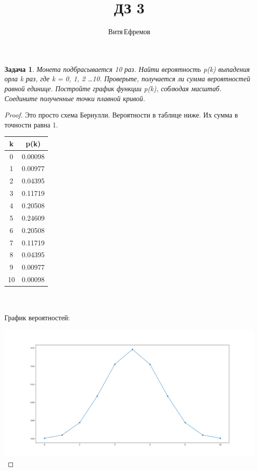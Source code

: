 \documentclass[a4paper,12pt]{article}
\newtheorem{problem}{Задача}
\newenvironment{solution}{\renewcommand{\proofname}{\unskip\indent\nopunct}\begin{proof}}{\end{proof}}
\begin{document}
\title{ДЗ 3}
\author{Витя\,Ефремов}
\maketitle

\begin{problem}
Монета подбрасывается 10 раз.
Найти вероятность p(k) выпадения орла k раз, где k = 0, 1, 2 \dots 10.
Проверьте, получается ли сумма вероятностей равной единице.
Постройте график функции p(k), соблюдая масштаб.
Соедините полученные точки плавной кривой.
\end{problem}
\begin{solution}
Это просто схема Бернулли.
Вероятности в таблице ниже.
Их сумма в точности равна 1.

\begin{tabular}{|c|c|}
\hline
k & p(k) \\
\hline
0 & 0.00098 \\
1 & 0.00977 \\
2 & 0.04395 \\
3 & 0.11719 \\
4 & 0.20508 \\
5 & 0.24609 \\
6 & 0.20508 \\
7 & 0.11719 \\
8 & 0.04395 \\
9 & 0.00977 \\
10 & 0.00098 \\
\hline
\end{tabular}
\\
\\
График вероятностей:

\includegraphics[width=\textwidth]{hw_3.1}

\end{solution}
\end{document}
